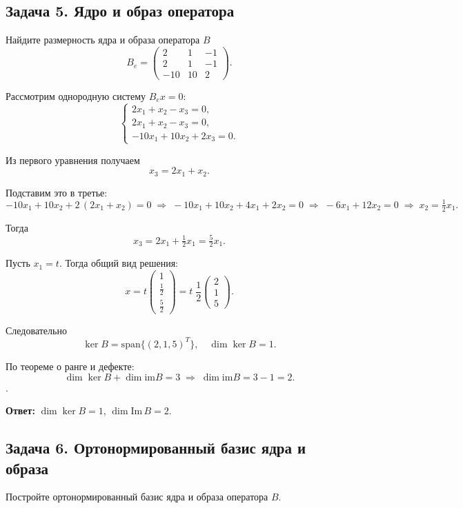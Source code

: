 \documentclass[12pt]{article}
\begin{document}
\subsection*{Задача 5. Ядро и образ оператора}
Найдите размерность ядра и образа оператора $ B $
\[
	B_e=
	\begin{pmatrix}
		2   & 1  & -1 \\
		2   & 1  & -1 \\
		-10 & 10 & 2
	\end{pmatrix}.
\]

Рассмотрим однородную систему $B_e x=0$:
\[
	\begin{cases}
		2x_1 + x_2 - x_3 = 0, \\
		2x_1 + x_2 - x_3 = 0, \\
		-10x_1 + 10x_2 + 2x_3 = 0.
	\end{cases}
\]

Из первого уравнения получаем
\[
	x_3 = 2x_1 + x_2.
\]

Подставим это в третье:
\[
	-10x_1 + 10x_2 + 2\,(2x_1 + x_2) = 0
	\;\Longrightarrow\;
	-10x_1 + 10x_2 + 4x_1 + 2x_2 = 0
	\;\Longrightarrow\;
	-6x_1 + 12x_2 = 0
	\;\Longrightarrow\;
	x_2 = \tfrac12 x_1.
\]

Тогда
\[
	x_3 = 2x_1 + \tfrac12 x_1 = \tfrac52 x_1.
\]

Пусть $x_1 = t$. Тогда общий вид решения:
\[
	x = t
	\begin{pmatrix}
		1        \\
		\tfrac12 \\
		\tfrac52
	\end{pmatrix}
	= t\;\frac12
	\begin{pmatrix}
		2 \\1\\5
	\end{pmatrix}.
\]

Следовательно
\[
	\ker B = \mathrm{span}\{(2,1,5)^T\},
	\quad
	\dim\ker B = 1.
\]

По теореме о ранге и дефекте:
\[
	\dim\ker B + \dim \mathrm{im} B = 3
	\;\Longrightarrow\;
	\dim \mathrm{im} B = 3 - 1 = 2.
\]
.

\textbf{Ответ:} \(\dim\ker B = 1\), \(\dim\mathrm{Im}\,B = 2\).

\subsection*{Задача 6. Ортонормированный базис ядра и образа}
Постройте ортонормированный базис ядра и образа оператора $ B $.
\end{document}

